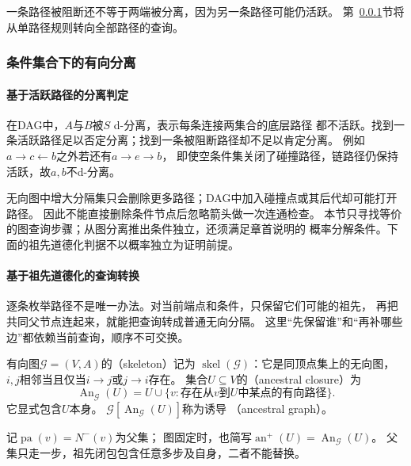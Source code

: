 一条路径被阻断还不等于两端被分离，因为另一条路径可能仍活跃。
第~\ref{sec:graph-theory-conditional-separation}节将从单路径规则转向全部路径的查询。

\subsubsection{条件集合下的有向分离}
\label{sec:graph-theory-conditional-separation}

\paragraph{基于活跃路径的分离判定}

在DAG中，\(A\)与\(B\)被\(S\) d-分离，表示每条连接两集合的底层路径
都不活跃。找到一条活跃路径足以否定分离；找到一条被阻断路径却不足以肯定分离。
例如\(a\to c\leftarrow b\)之外若还有\(a\to e\to b\)，
即使空条件集关闭了碰撞路径，链路径仍保持活跃，故\(a,b\)不d-分离。

无向图中增大分隔集只会删除更多路径；DAG中加入碰撞点或其后代却可能打开路径。
因此不能直接删除条件节点后忽略箭头做一次连通检查。
本节只寻找等价的图查询步骤；从图分离推出条件独立，还须满足章首说明的
概率分解条件。下面的祖先道德化判据不以概率独立为证明前提。

\paragraph{基于祖先道德化的查询转换}
\label{sec:graph-theory-directed-transformations}

逐条枚举路径不是唯一办法。对当前端点和条件，只保留它们可能的祖先，
再把共同父节点连起来，就能把查询转成普通无向分隔。
这里“先保留谁”和“再补哪些边”都依赖当前查询，顺序不可交换。

\begin{definition}[骨架、祖先闭包与诱导祖先图]
  \label{def:graph-theory-directed-structure}
  有向图\(\mathcal G=(V,A)\)的（skeleton）记为
  \(\operatorname{skel}(\mathcal G)\)：它是同顶点集上的无向图，
  \(i,j\)相邻当且仅当\(i\to j\)或\(j\to i\)存在。
  集合\(U\subseteq V\)的（ancestral closure）为
  \[
    \operatorname{An}_{\mathcal G}(U)
    =U\cup\{v:\text{存在从\(v\)到\(U\)中某点的有向路径}\}.
  \]
  它显式包含\(U\)本身。
  \(\mathcal G[\operatorname{An}_{\mathcal G}(U)]\)称为诱导
  （ancestral graph）。
\end{definition}

记\(\operatorname{pa}(v)=N^-(v)\)为父集；
图固定时，也简写\(\operatorname{an}^{+}(U)=\operatorname{An}_{\mathcal G}(U)\)。
父集只走一步，祖先闭包包含任意多步及自身，二者不能替换。

